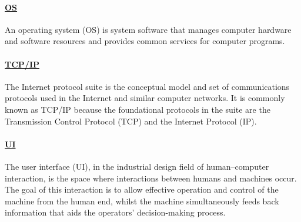 \documentclass[10pt]{article}
\begin{document}
\paragraph{\underline{OS}} An operating system (OS) is system software that manages computer hardware and software resources and provides common services for computer programs.

\paragraph{\underline{TCP/IP}} The Internet protocol suite is the conceptual model and set of communications protocols used in the Internet and similar computer networks. It is commonly known as TCP/IP because the foundational protocols in the suite are the Transmission Control Protocol (TCP) and the Internet Protocol (IP).

\paragraph{\underline{UI}} The user interface (UI), in the industrial design field of human–computer interaction, is the space where interactions between humans and machines occur. The goal of this interaction is to allow effective operation and control of the machine from the human end, whilst the machine simultaneously feeds back information that aids the operators' decision-making process.

\end{document}

